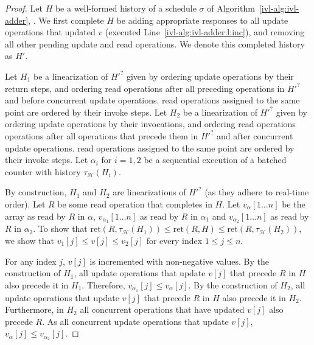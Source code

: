 \begin{proof}
    Let $H$ be a well-formed history of a schedule $\sigma$ of Algorithm~\ref{ivl-alg:ivl-adder},
    .
    We first complete $H$ be adding appropriate responses to all {\sc update} operations
    that updated $v$ (executed Line~\ref{ivl-alg:ivl-adder:l:inc}), and removing all other pending {\sc update} and {\sc read} operations.
    We denote this completed history as $H'$.

    Let $H_1$ be a linearization of $H'^?$ given by ordering {\sc update} operations by their
    return steps, and ordering {\sc read} operations after all preceding operations in $H'^?$ and before concurrent {\sc update} operations.
    {\sc read} operations assigned to the same point are ordered by their invoke steps.
    Let $H_2$ be a linearization of $H'^?$ given by ordering {\sc update} operations by their
    invocations, and ordering {\sc read} operations operations after all operations that precede them in $H'^?$ and after concurrent {\sc update} operations. 
    {\sc read} operations assigned to the same point are ordered by their invoke steps.
    Let $\alpha_i$ for $i=1,2$ be a sequential execution of a batched counter with history $\tau_\mathcal{H}(H_i)$.

    By construction, $H_1$ and $H_2$ are linearizations of $H'^?$ (as they adhere to real-time order).
    Let $R$ be some {\sc read} operation that completes
    in $H$. Let $v_{\alpha}[1 \dots n]$ be the array as read by $R$ in $\alpha$, $v_{\alpha_1}[1 \dots n]$ as read by $R$ in $\alpha_1$
    and $v_{\alpha_2}[1 \dots n]$ as read by $R$ in $\alpha_2$. To show that
    $\text{ret}(R, \tau_\mathcal{H}(H_1)) \leq \text{ret}(R, H) \leq \text{ret}(R, \tau_\mathcal{H}(H_2))$,
    we show that $v_1[j] \leq v[j] \leq v_2[j]$ for every index $1 \leq j \leq n$.

    For any index $j$, $v[j]$ is incremented with non-negative values. By the construction of $H_1$, all {\sc update}
    operations that update $v[j]$ that precede $R$ in $H$ also precede it in $H_1$. Therefore, $v_{\alpha_1}[j] \leq v_{\alpha}[j]$.
    By the construction of $H_2$, all {\sc update} operations that update $v[j]$ that precede $R$ in $H$ also precede it in $H_2$.
    Furthermore, in $H_2$ all concurrent operations that have updated $v[j]$ also precede $R$. As  all concurrent
    {\sc update} operations that update $v[j]$, $v_{\alpha}[j] \leq v_{\alpha_2}[j]$.


\end{proof}
